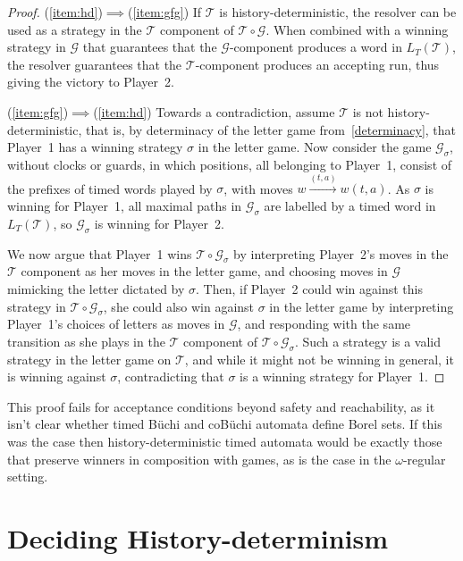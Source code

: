 \documentclass[10pt,a4paper]{amsart}
\theoremstyle{definition}
\numberwithin{equation}{section}
\newcommand{\T}{\mathcal{T}}
\newcommand{\gsgame}{\mathcal{G}}
\newcommand{\comp}[2]{#2\circ #1}
\newcommand{\strat}{\sigma}
\newcommand{\lang}{L_T}  %
\begin{document}
\begin{proof}
	(\ref{item:hd})$\implies$(\ref{item:gfg}) If $\T$ is history-deterministic, the resolver can be used as a strategy in the $\T$ component of $\comp{\gsgame}{\T}$. When combined with a winning strategy in $\gsgame$ that guarantees that the $\gsgame$-component produces a word in $\lang(\T)$, the resolver guarantees that the $\T$-component produces an accepting run, thus giving the victory to Player~2.
	
	(\ref{item:gfg})$\implies$(\ref{item:hd}) Towards a contradiction, assume $\T$ is not history-deterministic, that is, by determinacy of the letter game from~\cref{determinacy}, that Player~1 has a winning strategy $\strat$ in the letter game.
	Now consider the game $\gsgame_\strat$, without clocks or guards, in which positions, all belonging to Player~1, consist of the prefixes of timed words played by $\strat$, with moves $w\xrightarrow{(t,a)} w(t,a)$. %
	As $\strat$ is winning for Player~1, all maximal paths in $\gsgame_\strat$ are labelled by a timed word in $\lang(\T)$, so $\gsgame_\strat$ is winning for Player~2.
	
	We now argue that Player~1 wins $\comp{\gsgame_\strat}{\T}$ by interpreting Player~2's moves in the $\T$ component as her moves in the letter game, and choosing moves in $\gsgame$ mimicking the letter dictated by $\strat$. Then, if Player~2 could win against this strategy in $\comp{\gsgame_\strat}{\T}$, she could also win against $\strat$ in the letter game by interpreting Player~1's choices of letters as moves in $\gsgame$, and responding with the same transition as she plays in the $\T$ component of $\comp{\gsgame_\strat}{\T}$. Such a strategy is a valid strategy in the letter game on $\T$, and while it might not be winning in general, it is winning against $\strat$, contradicting that $\strat$ is a winning strategy for Player~1.
\end{proof}

This proof fails for acceptance conditions beyond safety and reachability, as it isn't clear whether timed B\"uchi and coB\"uchi automata define Borel sets. If this was the case then history-deterministic timed automata would be exactly those that preserve winners in composition with games, as is the case in the $\omega$-regular setting.

	
	\section{Deciding History-determinism}
	\label{sec_decision}
	\label{sec:decision}
\end{document}
